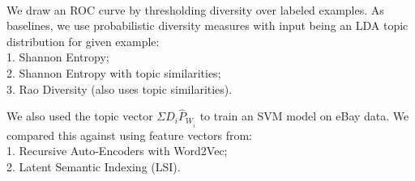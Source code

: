 \documentclass[portrait,a0paper]{baposter-templ/baposter}
\begin{document}
\begin{poster}
{\begin{multicols}{2}
\ \\
We draw an ROC curve by thresholding diversity
  over labeled examples. As baselines, we use probabilistic diversity 
  measures with input being an LDA topic distribution for  given
  example:\\
1. Shannon Entropy;\\
2. Shannon Entropy with topic similarities;\\
3. Rao Diversity (also uses topic similarities).

\vspace{3.5em}
We also used the topic vector $\Sigma
D_i \widehat{P}_{W_{\bar{i}}}$ to train an SVM model on eBay data. We
compared this against using feature vectors from:\\ 
1. Recursive Auto-Encoders with Word2Vec;\\
2. Latent Semantic Indexing (LSI).
\end{multicols}
}







\end{poster}
\end{document}
